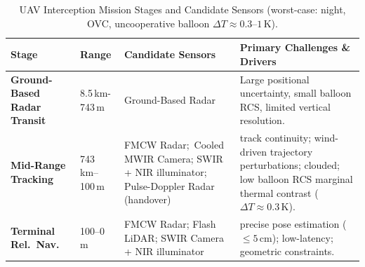 \begin{table}[H]
\centering
\caption{UAV Interception Mission Stages and Candidate Sensors
         (worst-case: night, OVC, uncooperative balloon \(\Delta T \approx 0.3\)–\(1\,\)K).}
\label{tab:uav_mission_stages_sensors}
\small
\begin{tabularx}{\textwidth}{p{2.5cm} p{1.6cm} X p{5.8cm}}
\toprule
\textbf{Stage} & \textbf{Range} & \textbf{Candidate Sensors} & \textbf{Primary Challenges \& Drivers} \\
\midrule

\textbf{Ground-Based Radar Transit}
  & 8.5\,km-743\,m
  & Ground-Based Radar
  & Large positional uncertainty, small balloon RCS, limited vertical resolution. \\[4pt]



\textbf{Mid-Range Tracking}
  & 743\,km–100\,m
  & FMCW Radar;\
    Cooled MWIR Camera;
    SWIR + NIR illuminator;
    Pulse-Doppler Radar (handover)
  & track continuity; wind-driven
    trajectory perturbations; clouded; low balloon RCS marginal
    thermal contrast ($\Delta T \approx 0.3\,\text{K}$). \\[4pt]

\textbf{Terminal Rel.\ Nav.}
  & 100–0\,m
  & FMCW Radar;
    Flash LiDAR;
    SWIR Camera + NIR illuminator
  & precise pose estimation ($\leq\!5\,\text{cm}$);
    low-latency; geometric constraints. \\

\bottomrule
\end{tabularx}
\end{table}

\iffalse

